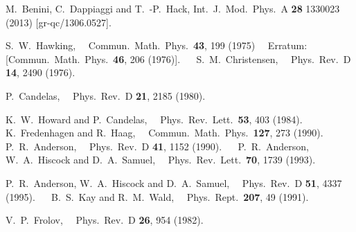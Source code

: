 \documentclass[aps, prd, amsmath, floats, floatfix, twocolumn, nofootinbib, superscriptaddress, showpacs]{revtex4-1}
\begin{document}
\begin{thebibliography}{99}

	M.~Benini, C.~Dappiaggi and T.~-P.~Hack,
	Int.\ J.\ Mod.\ Phys.\ A {\bf 28} 1330023 (2013)
	[gr-qc/1306.0527].

  S.~W.~Hawking,
  Commun.\ Math.\ Phys.\  {\bf 43}, 199 (1975)
  Erratum: [Commun.\ Math.\ Phys.\  {\bf 46}, 206 (1976)].
  
  S.~M.~Christensen,
  Phys.\ Rev.\ D {\bf 14}, 2490 (1976).

  P.~Candelas,
  Phys.\ Rev.\ D {\bf 21}, 2185 (1980).

  K.~W.~Howard and P.~Candelas,
  Phys.\ Rev.\ Lett.\  {\bf 53}, 403 (1984).
  
  K.~Fredenhagen and R.~Haag,
  Commun.\ Math.\ Phys.\  {\bf 127}, 273 (1990).
  
  P.~R.~Anderson,
  Phys.\ Rev.\ D {\bf 41}, 1152 (1990).
  
  P.~R.~Anderson, W.~A.~Hiscock and D.~A.~Samuel,
  Phys.\ Rev.\ Lett.\  {\bf 70}, 1739 (1993).

  P.~R.~Anderson, W.~A.~Hiscock and D.~A.~Samuel,
  Phys.\ Rev.\ D {\bf 51}, 4337 (1995).
  
  B.~S.~Kay and R.~M.~Wald,
  Phys.\ Rept.\  {\bf 207}, 49 (1991).

  V.~P.~Frolov,
  Phys.\ Rev.\ D {\bf 26}, 954 (1982).


\end{thebibliography}
\end{document}
